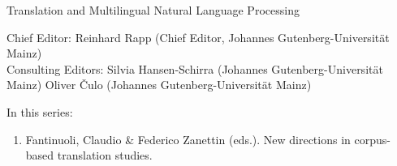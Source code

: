 {\large Translation and Multilingual Natural Language Processing}

\bigskip

Chief Editor: Reinhard Rapp (Chief Editor, Johannes Gutenberg-Universität Mainz) \\
Consulting Editors: Silvia Hansen-Schirra (Johannes Gutenberg-Universität Mainz)
Oliver Čulo (Johannes Gutenberg-Universität Mainz)

\bigskip

In this series:

\begin{enumerate}
\item Fantinuoli, Claudio \& Federico Zanettin (eds.). New directions in corpus-based translation studies.
\end{enumerate}



